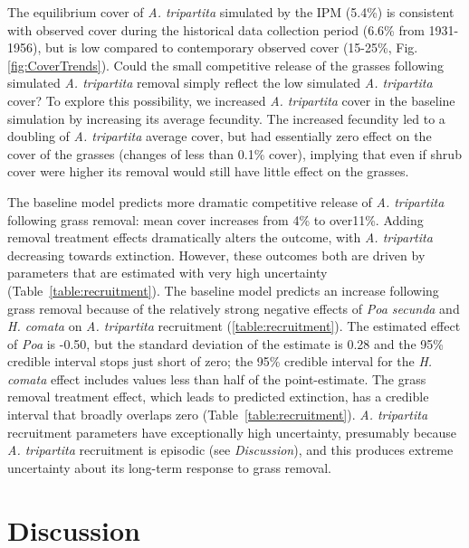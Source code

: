 \documentclass[11pt]{article}
\begin{document}
\begin{doublespacing}
The equilibrium cover of \textit{A. tripartita} simulated by the IPM (5.4\%) is consistent with observed cover during the historical data collection period (6.6\% from 1931-1956), but is low compared to contemporary observed cover (15-25\%, Fig. \ref{fig:CoverTrends}). Could the small competitive release of the grasses
following simulated \textit{A. tripartita} removal simply reflect the low simulated \textit{A. tripartita} cover? To explore this possibility, we increased \textit{A. tripartita} cover in the baseline simulation by increasing its average fecundity. The increased fecundity led to a doubling of \textit{A. tripartita} average cover, but had essentially zero effect on the cover of the grasses (changes of less than 0.1\% cover), implying that even if shrub cover were higher its removal would still have little effect on the grasses. 
 
The baseline model predicts more dramatic competitive release of \textit{A. tripartita} following grass removal: mean cover increases from 4\% to over11\%. 
Adding removal treatment effects dramatically alters the outcome, with \textit{A. tripartita} decreasing towards extinction. However, these outcomes both are driven by parameters that are estimated with very high uncertainty (Table~\ref{table:recruitment}). The baseline model predicts an increase following grass removal because of the relatively strong negative effects of \textit{Poa secunda} and \textit{H. comata} on \textit{A. tripartita} recruitment (\ref{table:recruitment}). The estimated effect of
\emph{Poa} is -0.50, but the standard deviation of the estimate is 0.28 and the 95\% credible interval stops just short of zero; the 95\% credible interval for the
\textit{H. comata} effect includes values less than half of the point-estimate. The grass removal treatment effect, which leads to predicted extinction, has a credible 
interval that broadly overlaps zero (Table~\ref{table:recruitment}). \textit{A. tripartita} recruitment parameters have exceptionally high uncertainty, presumably 
because \textit{A. tripartita} recruitment is episodic (see \emph{Discussion}), and this produces extreme uncertainty about its long-term 
response to grass removal.

\section*{Discussion}


\end{doublespacing}
\end{document}
